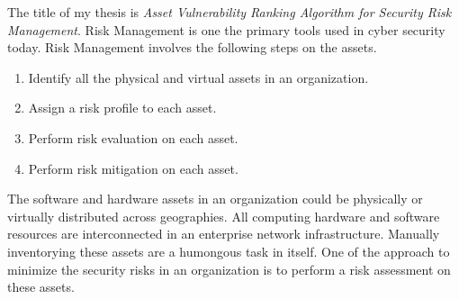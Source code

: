 \documentclass[letterpaper,12pt]{texMemo}
\begin{document}
%
%


\noindent The title of my thesis is \textit{Asset Vulnerability Ranking Algorithm for Security Risk Management}. Risk Management is one the primary tools used in cyber security today. Risk Management involves the following steps on the assets.
 \begin{enumerate}
     \item Identify all the physical and virtual assets in an organization.
     \item Assign a risk profile to each asset.
     \item Perform risk evaluation on each asset.
     \item Perform risk mitigation on each asset.
 \end{enumerate}

\noindent The software and hardware assets in an organization could be physically or virtually distributed across geographies. All computing hardware and software resources are interconnected in an enterprise network infrastructure. Manually inventorying these assets are a humongous task in itself. One of the approach to minimize the security risks in an organization is to perform a risk assessment on these assets.
\end{document}
